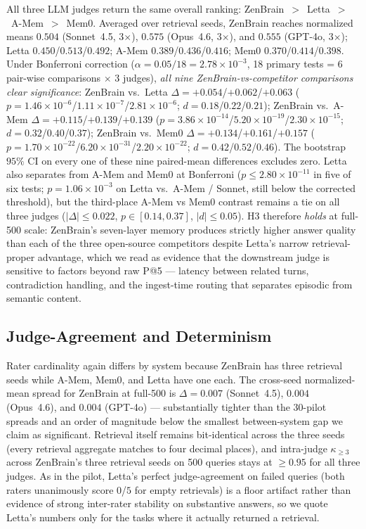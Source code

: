 \documentclass{article}
\begin{document}
All three LLM
judges return the same overall ranking:
ZenBrain~$>$~Letta~$>$~A-Mem~$>$~Mem0.
Averaged over retrieval seeds, ZenBrain reaches normalized means
$0.504$ (Sonnet~4.5, 3$\times$), $0.575$ (Opus~4.6, 3$\times$), and
$0.555$ (GPT-4o, 3$\times$); Letta $0.450$/$0.513$/$0.492$;
A-Mem $0.389$/$0.436$/$0.416$; Mem0
$0.370$/$0.414$/$0.398$. Under Bonferroni correction
($\alpha{=}0.05/18{=}2.78\times 10^{-3}$, 18 primary tests = 6 pair-wise
comparisons $\times$ 3 judges), \emph{all nine ZenBrain-vs-competitor
comparisons clear significance}:
ZenBrain vs.\ Letta $\Delta{=}{+}0.054$/${+}0.062$/${+}0.063$
($p{=}1.46{\times}10^{-6}$/$1.11{\times}10^{-7}$/$2.81{\times}10^{-6}$;
$d{=}0.18$/$0.22$/$0.21$);
ZenBrain vs.\ A-Mem $\Delta{=}{+}0.115$/${+}0.139$/${+}0.139$
($p{=}3.86{\times}10^{-14}$/$5.20{\times}10^{-19}$/$2.30{\times}10^{-15}$;
$d{=}0.32$/$0.40$/$0.37$);
ZenBrain vs.\ Mem0 $\Delta{=}{+}0.134$/${+}0.161$/${+}0.157$
($p{=}1.70{\times}10^{-22}$/$6.20{\times}10^{-31}$/$2.20{\times}10^{-22}$;
$d{=}0.42$/$0.52$/$0.46$). The bootstrap $95\%$ CI on every one of
these nine paired-mean differences excludes zero. Letta also
separates from A-Mem and Mem0 at Bonferroni
($p \leq 2.80{\times}10^{-11}$ in five of six tests;
$p{=}1.06{\times}10^{-3}$ on Letta vs.\ A-Mem / Sonnet, still below the
corrected threshold), but the third-place A-Mem vs
Mem0 contrast remains a tie on all three judges
($|\Delta| \leq 0.022$, $p \in [0.14, 0.37]$, $|d| \leq 0.05$).
H3 therefore \emph{holds} at full-500 scale: ZenBrain's
seven-layer memory produces strictly higher answer quality than
each of the three open-source competitors despite Letta's narrow
retrieval-proper advantage, which we read as evidence that the
downstream judge is sensitive to factors beyond raw P@5 --- latency
between related turns, contradiction handling, and the ingest-time
routing that separates episodic from semantic content.

\subsection{Judge-Agreement and Determinism}
\label{app:longmemeval-agreement}

Rater cardinality again
differs by system because ZenBrain has three retrieval seeds while
A-Mem, Mem0, and Letta have one each.
The cross-seed normalized-mean spread for ZenBrain at full-500 is
$\Delta{=}0.007$ (Sonnet~4.5), $0.004$ (Opus~4.6), and $0.004$
(GPT-4o) --- substantially tighter than the 30-pilot spreads and an
order of magnitude below the smallest between-system gap we claim as
significant. Retrieval
itself remains bit-identical across the three seeds (every retrieval
aggregate matches to four decimal places), and intra-judge
$\kappa_{\geq 3}$ across ZenBrain's three retrieval seeds on 500
queries stays at $\geq 0.95$ for all three judges. As in the pilot,
Letta's perfect judge-agreement on failed queries (both raters
unanimously score $0$/$5$ for empty retrievals) is a floor
artifact rather than evidence of strong inter-rater stability on
substantive answers, so we quote Letta's numbers only for the
tasks where it actually returned a retrieval.
\end{document}
